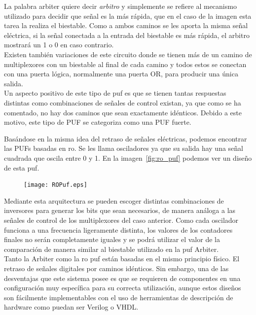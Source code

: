\documentclass[spanish]{template/minim}
\begin{document}
La palabra arbiter quiere decir \textit{arbitro} y simplemente se refiere al mecanismo utilizado para decidir que señal es la más rápida, que en el caso de la imagen esta tarea la realiza el biestable. Como a ambos caminos se les aporta la misma señal eléctrica, si la señal conectada a la entrada del biestable es más rápida, el arbitro mostrará un 1 o 0 en caso contrario.\\

Existen también variaciones de este circuito donde se tienen más de un camino de multiplexores con un biestable al final de cada camino y todos estos se conectan con una puerta lógica, normalmente una puerta OR, para producir una única salida.\\

Un aspecto positivo de este tipo de \gls{puf} es que se tienen tantas respuestas distintas como combinaciones de señales de control existan, ya que como se ha comentado, no hay dos caminos que sean exactamente idénticos. Debido a este motivo, este tipo de PUF se categoriza como una PUF fuerte.\\


Basándose en la misma idea del retraso de señales eléctricas, podemos encontrar las PUFs basadas en \gls{ro}. Se les llama osciladores ya que su salida hay una señal cuadrada que oscila entre 0 y 1. En la imagen~\ref{fig:ro_puf} podemos ver un diseño de esta \gls{puf}.\\

\begin{figure}[H]
    \centering
    \texttt{[image: ROPuf.eps]}
\end{figure}

Mediante esta arquitectura se pueden escoger distintas combinaciones de inversores para generar los bits que sean necesarios, de manera análoga a las señales de control de los multiplexores del caso anterior. Como cada oscilador funciona a una frecuencia ligeramente distinta, los valores de los contadores finales no serán completamente iguales y se podrá utilizar el valor de la comparación de manera similar al biestable utilizado en la \gls{puf} Arbiter.\\

Tanto la Arbiter como la \gls{ro} \gls{puf} están basadas en el mismo principio físico. El retraso de señales digitales por caminos idénticos. Sin embargo, una de las desventajas que este sistema posee es que se requieren de componentes en una configuración muy específica para su correcta utilización, aunque estos diseños son fácilmente implementables con el uso de herramientas de descripción de hardware como puedan ser Verilog o VHDL.\\
\end{document}
